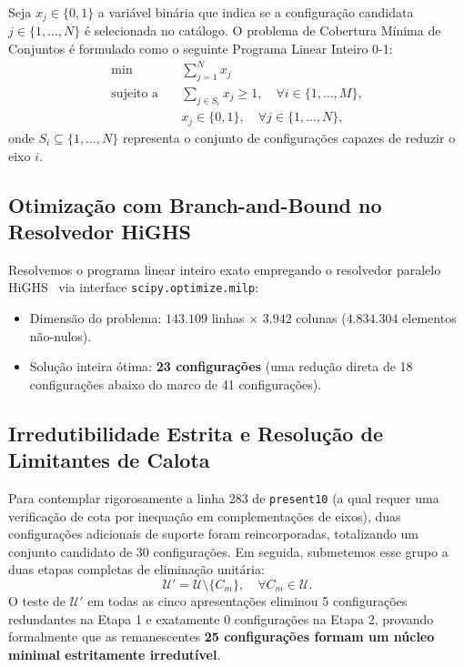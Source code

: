 \documentclass[11pt,a4paper]{article}
\theoremstyle{plain}
\theoremstyle{definition}
\begin{document}
Seja $x_j \in \{0, 1\}$ a variável binária que indica se a configuração candidata $j \in \{1, \dots, N\}$ é selecionada no catálogo. O problema de Cobertura Mínima de Conjuntos é formulado como o seguinte Programa Linear Inteiro 0-1:
\begin{align}
\min \quad & \sum_{j=1}^N x_j \\
\text{sujeito a} \quad & \sum_{j \in S_i} x_j \ge 1, \quad \forall i \in \{1, \dots, M\}, \\
& x_j \in \{0, 1\}, \quad \forall j \in \{1, \dots, N\},
\end{align}
onde $S_i \subseteq \{1, \dots, N\}$ representa o conjunto de configurações capazes de reduzir o eixo $i$.

\subsection{Otimização com Branch-and-Bound no Resolvedor HiGHS}

Resolvemos o programa linear inteiro exato empregando o resolvedor paralelo HiGHS~\cite{huangfu2018parallelizing} via interface \texttt{scipy.optimize.milp}:
\begin{itemize}
    \item Dimensão do problema: $143.109$ linhas $\times$ $3.942$ colunas ($4.834.304$ elementos não-nulos).
    \item Solução inteira ótima: \textbf{23 configurações} (uma redução direta de 18 configurações abaixo do marco de 41 configurações).
\end{itemize}

\subsection{Irredutibilidade Estrita e Resolução de Limitantes de Calota}

Para contemplar rigorosamente a linha 283 de \texttt{present10} (a qual requer uma verificação de cota por inequação em complementações de eixos), duas configurações adicionais de suporte foram reincorporadas, totalizando um conjunto candidato de 30 configurações. Em seguida, submetemos esse grupo a duas etapas completas de eliminação unitária:
\begin{equation}
\mathcal{U}' = \mathcal{U} \setminus \{C_m\}, \quad \forall C_m \in \mathcal{U}.
\end{equation}
O teste de $\mathcal{U}'$ em todas as cinco apresentações eliminou 5 configurações redundantes na Etapa 1 e exatamente 0 configurações na Etapa 2, provando formalmente que as remanescentes \textbf{25 configurações formam um núcleo minimal estritamente irredutível}.
\end{document}
